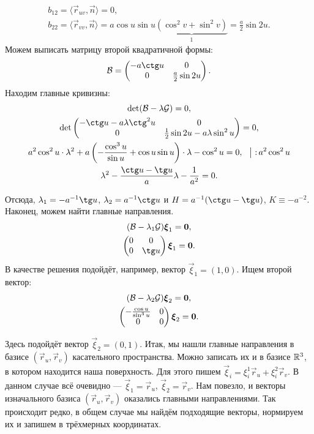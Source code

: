 \begin{solution}
\begin{multline*}
	\end{multline*}
	\begin{gather*}
		b_{12} = \langle\vec{r}_{uv}, \vec{n}\rangle = 0,\\
		b_{22} = \langle\vec{r}_{vv}, \vec{n}\rangle = {a\cos u\sin u\underbrace{(\cos^2 v + \sin ^2 v)}_{1}} = \frac{a}{2}\sin 2u.
	\end{gather*}
	Можем выписать матрицу второй квадратичной формы:
	\[
		\B =
		\begin{pmatrix}
			-a\ctg u & 0\\
			0 & \frac{a}{2}\sin 2u
		\end{pmatrix}.
	\]
	Находим главные кривизны:
	\begin{gather*}
		\det(\B - \lambda\G) = 0,\\
		\det
		\begin{pmatrix}
			-\ctg u - a\lambda \ctg^2u & 0\\
			0 & \frac{1}{2}\sin 2u - a\lambda \sin^2u
		\end{pmatrix} = 0,\\
		a^2\cos^2u \cdot \lambda^2 + a\br{{-\frac{\cos^3u}{\sin u}} + \cos u\sin u} \cdot \lambda -\cos^2 u = 0,\ \ \big|\ {:}\,a^2\cos^2u\\
		\lambda^2 - \frac{\ctg u - \tg u}{a}\lambda - \frac{1}{a^2} = 0.
	\end{gather*}

	Отсюда, $\lambda_1 = -a^{-1}\tg u$, $\lambda_2 = a^{-1}\ctg u$ и $H = a^{-1}(\ctg u - \tg u)$, $K \equiv -a^{-2}$. Наконец, можем найти главные направления.
	\begin{gather*}
		(\B - \lambda_1\G)\vec{\xi}_1 = \vec{0},\\
		\begin{pmatrix}
			0 & 0\\
			0 & \tg u
		\end{pmatrix}\vec{\xi}_1 = \vec{0}.
	\end{gather*}
	В качестве решения подойдёт, например, вектор $\vec{\xi}_1 = (1, 0)$. Ищем второй вектор:
	\begin{gather*}
		(\mathcal{B} - \lambda_2\mathcal{G})\boldsymbol{\xi}_2 = \boldsymbol{0},\\
		\begin{pmatrix}
			-\frac{\cos u}{\sin^3 u} & 0\\
			0 & 0
		\end{pmatrix}\boldsymbol{\xi}_2 = \boldsymbol{0}.
	\end{gather*}

	Здесь подойдёт вектор $\vec{\xi}_2 = (0, 1)$. Итак, мы нашли главные направления в базисе $(\vec{r}_u, \vec{r}_v)$ касательного пространства. Можно записать их и в базисе $\mathbb{R}^3$, в котором находится наша поверхность. Для этого пишем $\vec{\xi}_i = \xi_i^1\vec{r}_u + \xi_i^2\vec{r}_v$. В данном случае всё очевидно --- $\vec{\xi}_1 = \vec{r}_u$, $\vec{\xi}_2 = \vec{r}_v$. Нам повезло, и векторы изначального базиса $(\vec{r}_u, \vec{r}_v)$ оказались главными направлениями. Так происходит редко, в общем случае мы найдём подходящие векторы, нормируем их и запишем в трёхмерных координатах.
\end{solution}

